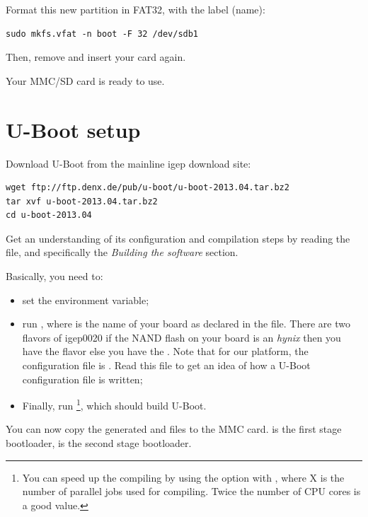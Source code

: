 Format this new partition in FAT32, with the  label (name):

\begin{verbatim}
sudo mkfs.vfat -n boot -F 32 /dev/sdb1
\end{verbatim}

Then, remove and insert your card again.

Your MMC/SD card is ready to use.

\section{U-Boot setup}

Download U-Boot from the mainline igep download site:

\begin{verbatim}
wget ftp://ftp.denx.de/pub/u-boot/u-boot-2013.04.tar.bz2
tar xvf u-boot-2013.04.tar.bz2
cd u-boot-2013.04
\end{verbatim}

Get an understanding of its configuration and compilation steps by
reading the  file, and specifically the {\em Building the
  software} section.

Basically, you need to:

\begin{itemize}

\item set the  environment variable;

\item run , where  is the name
  of your board as declared in the  file. There are
  two flavors of igep0020 if the NAND flash on your board is an {\em
    hynix} then you have the  flavor else you
  have the . Note that for our platform, the
  configuration file is . Read this
  file to get an idea of how a U-Boot configuration file is written;

\item Finally, run \footnote{You can speed up the compiling
  by using the  option with , where X is the number of parallel
  jobs used for compiling. Twice the number of CPU cores is a good
  value.}, which should build U-Boot.

\end{itemize}

You can now copy the generated  and  files
to the MMC card.  is the first stage bootloader,
 is the second stage bootloader.

